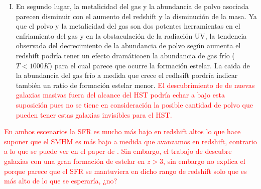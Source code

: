 \begin{enumerate}[I) ]
\item En segundo lugar, la metalicidad del gas y la abundancia de polvo asociada parecen disminuir con el aumento del redshift y la disminución de la masa. Ya que el polvo y la metalicidad del gas son dos potentes herramientas en el enfriamiento del gas y en la obstaculación de la radiación UV, la tendencia observada del decrecimiento de la abundancia de polvo según aumenta el redshift podría tener un efecto dramáticoen la abundancia de gas frío ($T<1000 K$) para el cual parece que ocurre la formación estelar. La caida de la abundancia del gas frío a medida que crece el redhsift pordría indicar también un ratio de formación estelar menor. \textcolor{red}{El descubrimiento de \cite{wang2019dominant} de nuevas galaxias masivas fuera del alcance del HST podría echar a bajo esta suposición pues no se tiene en consideración la posible cantidad de polvo que pueden tener estas galaxias invisibles para el HST.}
\end{enumerate}

\textcolor{red}{En ambos escenarios la SFR es mucho más bajo en redshift altos lo que hace suponer que el SMHM es más bajo a medida que avanzamos en redshift, contrario a lo que se puede ver en el paper de \cite{finkelstein2015increasing}. Sin embargo, el trabajo de \cite{wang2019dominant} descubre galaxias con una gran formación de estelar en $z>3$, sin embargo no explica el porque parece que el SFR se mantuviera en dicho rango de redshift solo que es más alto de lo que se esperaría, ¿no?} \\

